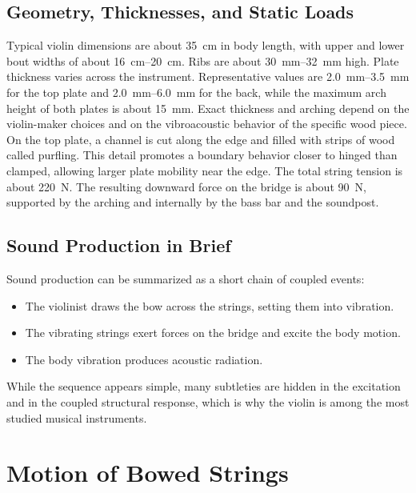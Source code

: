 \subsection{Geometry, Thicknesses, and Static Loads}

Typical violin dimensions are about \SI{35}{\centi\meter} in body length, with upper and lower bout widths of about \SIrange{16}{20}{\centi\meter}. Ribs are about \SIrange{30}{32}{\milli\meter} high. Plate thickness varies across the instrument. Representative values are \SIrange{2.0}{3.5}{\milli\meter} for the top plate and \SIrange{2.0}{6.0}{\milli\meter} for the back, while the maximum arch height of both plates is about \SI{15}{\milli\meter}. Exact thickness and arching depend on the violin-maker choices and on the vibroacoustic behavior of the specific wood piece. On the top plate, a channel is cut along the edge and filled with strips of wood called purfling. This detail promotes a boundary behavior closer to hinged than clamped, allowing larger plate mobility near the edge. The total string tension is about \SI{220}{\newton}. The resulting downward force on the bridge is about \SI{90}{\newton}, supported by the arching and internally by the bass bar and the soundpost.

\subsection{Sound Production in Brief}

Sound production can be summarized as a short chain of coupled events:

\begin{itemize}
    \item The violinist draws the bow across the strings, setting them into vibration.
    \item The vibrating strings exert forces on the bridge and excite the body motion.
    \item The body vibration produces acoustic radiation.
\end{itemize}

While the sequence appears simple, many subtleties are hidden in the excitation and in the coupled structural response, which is why the violin is among the most studied musical instruments. 

\section{Motion of Bowed Strings}

